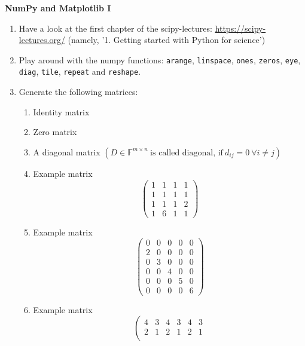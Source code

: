 \textbf{\normalsize NumPy and Matplotlib I}

\begin{enumerate}
\item Have a look at the first chapter of the scipy-lectures: \url{https://scipy-lectures.org/} (namely, '1. Getting started with Python for science')
\item Play around with the numpy functions: \verb|arange|, \verb|linspace|, \verb|ones|, \verb|zeros|, \verb|eye|, \verb|diag|, \verb|tile|, \verb|repeat| and \verb|reshape|.

\item Generate the following matrices:
\begin{enumerate}
     \item  Identity matrix 
     \item  Zero matrix
     \item  A diagonal matrix $\left(D \in \mathbb{F}^{m\times n} ~\text{is called diagonal, if}~ d_{ij}=0 ~\forall i\neq j \right)$
     \item  Example matrix $$
    \left(\begin{array}{rrrr}                                
    1 &  1& 1 & 1\\                                               
    1 &  1& 1 & 1\\                                              
    1 &  1 &  1 & 2   \\ 
    1 &  6 &  1 & 1
    \end{array}\right) \nonumber
    $$
     \item  Example matrix
    $$
    \left(\begin{array}{rrrrr}                                
    0 &  0& 0 & 0&0\\                                               
    2 &  0& 0 & 0&0\\                                              
    0 &  3& 0 & 0&0\\ 
    0 &  0& 4 & 0&0\\ 
    0 &  0& 0 & 5&0\\ 
    0 &  0& 0 & 0&6
    \end{array}\right) \nonumber
    $$
    \item  Example matrix 
    $$
    \left(\begin{array}{rrrrrr}                                
    4 &  3& 4 &3&4&3\\                                               
    2 &  1& 2 & 1&2&1\\                                              

\end{array}$$
\end{enumerate}
\end{enumerate}
